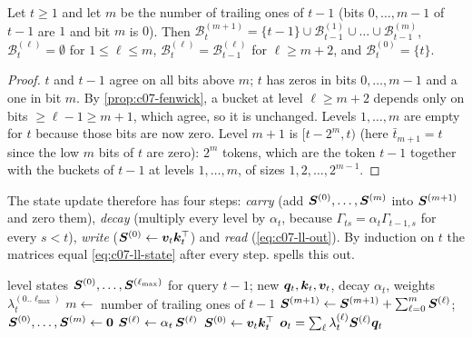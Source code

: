 \begin{lemma}[Carry]\label{lem:c07-carry}
Let $t \ge 1$ and let $m$ be the number of trailing ones of $t-1$ (bits $0,\dots,m-1$ of $t-1$
are $1$ and bit $m$ is $0$). Then
$\mathcal{B}_t^{(m+1)} = \{t-1\} \cup \mathcal{B}_{t-1}^{(1)} \cup \dots \cup \mathcal{B}_{t-1}^{(m)}$,
$\mathcal{B}_t^{(\ell)} = \emptyset$ for $1 \le \ell \le m$,
$\mathcal{B}_t^{(\ell)} = \mathcal{B}_{t-1}^{(\ell)}$ for $\ell \ge m+2$, and $\mathcal{B}_t^{(0)} = \{t\}$.
\end{lemma}
\begin{proof}
$t$ and $t-1$ agree on all bits above $m$; $t$ has zeros in bits $0,\dots,m-1$ and a one in bit
$m$. By \cref{prop:c07-fenwick}, a bucket at level $\ell \ge m+2$ depends only on bits
$\ge \ell-1 \ge m+1$, which agree, so it is unchanged. Levels $1,\dots,m$ are empty for $t$
because those bits are now zero. Level $m+1$ is $[t - 2^m, t)$ (here $\bar t_{m+1} = t$ since the
low $m$ bits of $t$ are zero): $2^m$ tokens, which are the token $t-1$ together with the
buckets of $t-1$ at levels $1,\dots,m$, of sizes $1, 2, \dots, 2^{m-1}$.
\end{proof}

The state update therefore has four steps: \emph{carry} (add $\bm{S}^{(0)},\dots,\bm{S}^{(m)}$ into
$\bm{S}^{(m+1)}$ and zero them), \emph{decay} (multiply every level by $\alpha_t$, because
$\Gamma_{ts} = \alpha_t\Gamma_{t-1,s}$ for every $s<t$), \emph{write}
($\bm{S}^{(0)} \gets \bm{v}_t\bm{k}_t^{\top}$) and \emph{read} (\cref{eq:c07-ll-out}). By induction on $t$ the
matrices equal \cref{eq:c07-ll-state} after every step.  spells this out.

\begin{algorithm}[t]
\caption{Log-linear attention: one decoding step (one head).}
\label{alg:c07-ll-decode}
\begin{algorithmic}[1]
\Require level states $\bm{S}^{(0)},\dots,\bm{S}^{(\ell_{\max})}$ for query $t-1$; new $\bm{q}_t,\bm{k}_t,\bm{v}_t$, decay $\alpha_t$, weights $\lambda_t^{(0..\ell_{\max})}$
  \State $m \gets$ number of trailing ones of $t-1$
  \State $\bm{S}^{(m+1)} \gets \bm{S}^{(m+1)} + \sum_{\ell=0}^{m}\bm{S}^{(\ell)}$; \quad $\bm{S}^{(0)},\dots,\bm{S}^{(m)} \gets \bm{0}$ 
\EndIf
{} $\bm{S}^{(\ell)} \gets \alpha_t\, \bm{S}^{(\ell)}$ \EndFor
\State $\bm{S}^{(0)} \gets \bm{v}_t\bm{k}_t^{\top}$
\State \Return $\bm{o}_t = \sum_{\ell} \lambda_t^{(\ell)}\bm{S}^{(\ell)}\bm{q}_t$
\end{algorithmic}
\end{algorithm}

